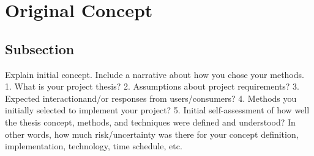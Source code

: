 \chapter{Original Concept}

\section{Subsection}
Explain initial concept. Include a narrative about how you chose your methods.
1. What is your project thesis?
2. Assumptions about project requirements?
3. Expected interactionand/or responses from users/consumers?
4. Methods you initially selected to implement your project?
5. Initial self-assessment of how well the thesis concept, methods, and techniques were defined and understood? In other words, how much risk/uncertainty was there for your concept definition, implementation, technology, time schedule, etc.